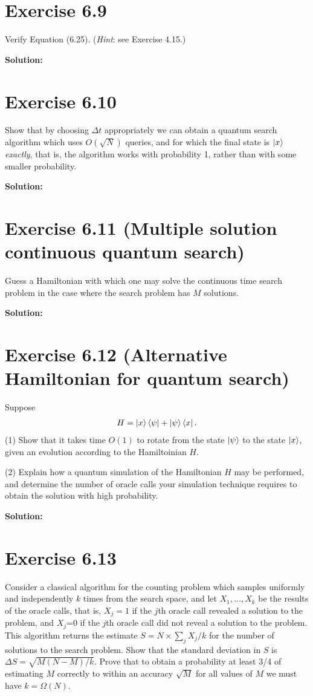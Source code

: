 \documentclass{book}
\begin{document}
    \section*{Exercise 6.9}
        Verify Equation (6.25). (\emph{Hint}: see Exercise 4.15.)
        
        \textbf{Solution:}
    
    \section*{Exercise 6.10}
        Show that by choosing $\Delta t$ appropriately we can obtain a quantum
        search algorithm which uses $O(\sqrt{N})$ queries, and for which the final state is $\ket{x}$ \emph{exactly}, that is, the algorithm works with probability 1, rather than with some smaller probability.
        
        \textbf{Solution:}
    
    \section*{Exercise 6.11 (Multiple solution continuous quantum search)}
        Guess a Hamiltonian with which one may solve the continuous time search problem in the case where the search problem has $M$ solutions.
        
        \textbf{Solution:}
    
    \section*{Exercise 6.12 (Alternative Hamiltonian for quantum search)}
        Suppose
        \begin{align}
            H = \ket{x}\bra{\psi}+\ket{\psi}\bra{x}.
        \end{align}
        (1) Show that it takes time $O(1)$ to rotate from the state $\ket{\psi}$ to the state $\ket{x}$, given an evolution according to the Hamiltoinian $H$. \par
        (2) Explain how a quantum simulation of the Hamiltonian $H$ may be performed, and determine the number of oracle calls your simulation technique requires to obtain the solution with high probability.
        
        \textbf{Solution:}
    
    \section*{Exercise 6.13}
        Consider a classical algorithm for the counting problem which samples uniformly and independently $k$ times from the search space, and let $X_1, ..., X_k$ be the results of the oracle calls, that is, $X_j = 1$ if the $j$th oracle call revealed a solution to the problem, and $X_j$=0 if the $j$th oracle call did not reveal a solution to the problem. This algorithm returns the estimate $S = N\times \sum_j X_j/k$ for the number of solutions to the search problem. Show that the standard deviation in $S$ is $\Delta S = \sqrt{M(N-M)/k}$. Prove that to obtain a probability at least 3/4 of estimating $M$ correctly to within an accuracy $\sqrt{M}$ for all values of $M$ we must have $k = \Omega(N)$.
        
\end{document}

